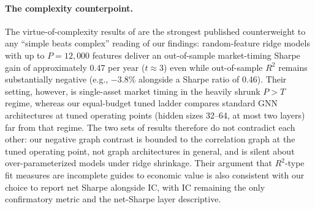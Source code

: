 \documentclass{article}
\begin{document}
\paragraph{The complexity counterpoint.} The virtue-of-complexity results of \citet{kmz2024jf} are the strongest published counterweight to any ``simple beats complex'' reading of our findings: random-feature ridge models with up to $P=12{,}000$ features deliver an out-of-sample market-timing Sharpe gain of approximately 0.47 per year ($t\approx3$) even while out-of-sample $R^2$ remains substantially negative (e.g., $-3.8\%$ alongside a Sharpe ratio of 0.46). Their setting, however, is single-asset market timing in the heavily shrunk $P>T$ regime, whereas our equal-budget tuned ladder compares standard GNN architectures at tuned operating points (hidden sizes 32--64, at most two layers) far from that regime. The two sets of results therefore do not contradict each other: our negative graph contrast is bounded to the correlation graph at the tuned operating point, not graph architectures in general, and is silent about over-parameterized models under ridge shrinkage. Their argument that $R^2$-type fit measures are incomplete guides to economic value is also consistent with our choice to report net Sharpe alongside IC, with IC remaining the only confirmatory metric and the net-Sharpe layer descriptive.

\end{document}
